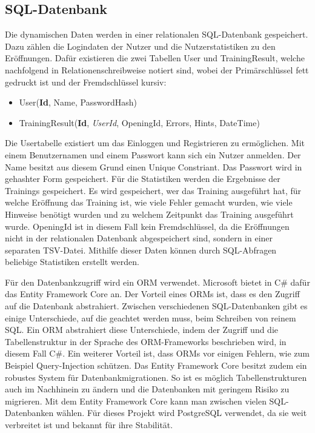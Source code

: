 \subsection{SQL-Datenbank}
Die dynamischen Daten werden in einer relationalen SQL-Datenbank gespeichert. Dazu zählen die Logindaten der Nutzer und die Nutzerstatistiken zu den Eröffnungen. Dafür existieren die zwei Tabellen User und TrainingResult, welche nachfolgend in Relationenschreibweise notiert sind, wobei der Primärschlüssel fett gedruckt ist und der Fremdschlüssel kursiv:

\begin{itemize}
  \item User(\textbf{Id}, Name, PasswordHash)
  \item TrainingResult(\textbf{Id}, \textit{UserId}, OpeningId, Errors, Hints, DateTime)
\end{itemize}

Die Usertabelle existiert um das Einloggen und Registrieren zu ermöglichen. Mit einem Benutzernamen und einem Passwort kann sich ein Nutzer anmelden. Der Name besitzt aus diesem Grund einen Unique Constriant. Das Passwort wird in gehashter Form gespeichert. Für die Statistiken werden die Ergebnisse der Trainings gespeichert. Es wird gespeichert, wer das Training ausgeführt hat, für welche Eröffnung das Training ist, wie viele Fehler gemacht wurden, wie viele Hinweise benötigt wurden und zu welchem Zeitpunkt das Training ausgeführt wurde. OpeningId ist in diesem Fall kein Fremdschlüssel, da die Eröffnungen nicht in der relationalen Datenbank abgespeichert sind, sondern in einer separaten TSV-Datei. Mithilfe dieser Daten können durch SQL-Abfragen beliebige Statistiken erstellt werden.

Für den Datenbankzugriff wird ein \ac{ORM} verwendet. Microsoft bietet in C\# dafür das Entity Framework Core an. Der Vorteil eines \ac{ORM}s ist, dass es den Zugriff auf die Datenbank abstrahiert. Zwischen verschiedenen SQL-Datenbanken gibt es einige Unterschiede, auf die geachtet werden muss, beim Schreiben von reinem SQL. Ein \ac{ORM} abstrahiert diese Unterschiede, indem der Zugriff und die Tabellenstruktur in der Sprache des ORM-Frameworks beschrieben wird, in diesem Fall C\#. Ein weiterer Vorteil ist, dass \ac{ORM}s vor einigen Fehlern, wie zum Beispiel Query-Injection schützen. Das Entity Framework Core besitzt zudem ein robustes System für Datenbankmigrationen. So ist es möglich Tabellenstrukturen auch im Nachhinein zu ändern und die Datenbanken mit geringem Risiko zu migrieren. Mit dem Entity Framework Core kann man zwischen vielen SQL-Datenbanken wählen. Für dieses Projekt wird PostgreSQL verwendet, da sie weit verbreitet ist und bekannt für ihre Stabilität.

